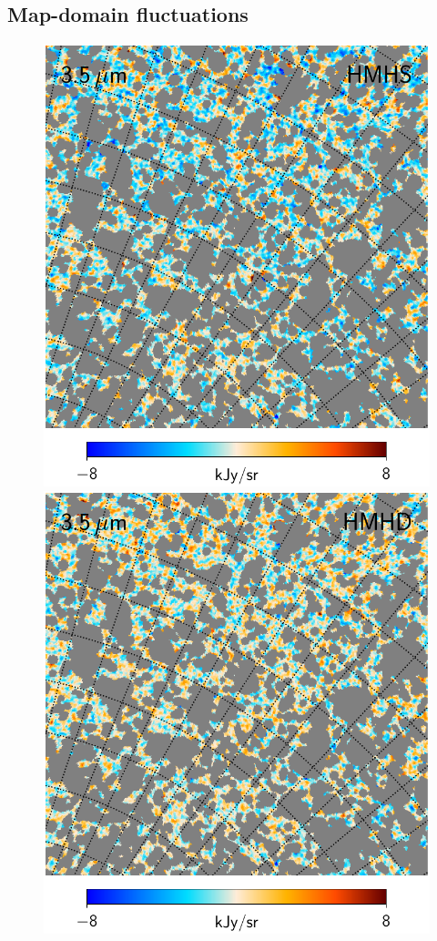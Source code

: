 \documentclass{aa}
\begin{document}
\subsection{Map-domain fluctuations}

\begin{figure}
  \centering
  \includegraphics[width=0.45\linewidth]{figs/CGDR2_03_hmhs_filter_15arc_5deg.pdf}\hspace*{0mm}
  \includegraphics[width=0.45\linewidth]{figs/CGDR2_03_hmhd_filter_15arc_5deg.pdf}

\end{figure}
\end{document}
